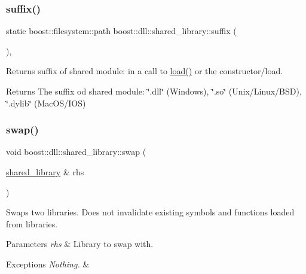\subsubsection{\texorpdfstring{suffix()}{suffix()}}
{\footnotesize\ttfamily static boost\+::filesystem\+::path boost\+::dll\+::shared\+\_\+library\+::suffix (\begin{DoxyParamCaption}{ }\end{DoxyParamCaption})\hspace{0.3cm}{\ttfamily [inline]}, {\ttfamily [static]}}

Returns suffix of shared module\+: in a call to \hyperlink{a01708_ae7df87e5b40963d6348a5962d9561f2e}{load()} or the constructor/load.

\begin{DoxyReturn}{Returns}
The suffix od shared module\+: \char`\"{}.\+dll\char`\"{} (Windows), \char`\"{}.\+so\char`\"{} (Unix/\+Linux/\+B\+SD), \char`\"{}.\+dylib\char`\"{} (Mac\+O\+S/\+I\+OS) 
\end{DoxyReturn}
\mbox{\label{a01708_a807769f77a82cb57ec1aabc028812a13}} 
\subsubsection{\texorpdfstring{swap()}{swap()}}
{\footnotesize\ttfamily void boost\+::dll\+::shared\+\_\+library\+::swap (\begin{DoxyParamCaption}\item[{\hyperlink{a01708}{shared\+\_\+library} \&}]{rhs }\end{DoxyParamCaption})\hspace{0.3cm}{\ttfamily [inline]}}

Swaps two libraries. Does not invalidate existing symbols and functions loaded from libraries.


\begin{DoxyParams}{Parameters}
{\em rhs} & Library to swap with. \\
\hline
\end{DoxyParams}

\begin{DoxyExceptions}{Exceptions}
{\em Nothing.} & \\
\hline
\end{DoxyExceptions}
\mbox{\label{a01708_a0c01ab046e5dcabe4c10db2a28cbe33e}} 

